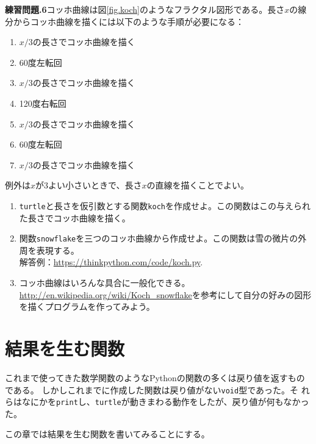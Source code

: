 \documentclass[a4j,12pt,makeidx]{jbook}
\newcommand{\tp}{\thechapter}
\begin{document}
\noindent
{\bf 練習問題\tp.6}コッホ曲線は図\ref{fig.koch}のようなフラクタル図形である。長さ{$x$}の線分からコッホ曲線を描くには以下のような手順が必要になる：
\begin{enumerate}
\item $x/3$の長さでコッホ曲線を描く
\item 60度左転回
\item $x/3$の長さでコッホ曲線を描く
\item 120度右転回
\item $x/3$の長さでコッホ曲線を描く
\item 60度左転回
\item $x/3$の長さでコッホ曲線を描く
\end{enumerate}
例外は$x$が$3$よい小さいときで、長さ$x$の直線を描くことでよい。\\

\begin{enumerate}
\item {\tt turtle}と長さを仮引数とする関数{\tt koch}を作成せよ。この関数はこの与えられた長さでコッホ曲線を描く。
\item 関数{\tt snowflake}を三つのコッホ曲線から作成せよ。この関数は雪の微片の外周を表現する。\\
解答例：\url{https://thinkpython.com/code/koch.py}.
\item コッホ曲線はいろんな具合に一般化できる。\\
\url{http://en.wikipedia.org/wiki/Koch_snowflake}を参考にして自分の好みの図形を描くプログラムを作ってみよう。
\end{enumerate}
%
\chapter{結果を生む関数}
これまで使ってきた数学関数のようなPythonの関数の多くは戻り値を返すものである。
しかしこれまでに作成した関数は戻り値がない{\tt void}型であった。そ
れらはなにかを{\tt print}し、{\tt turtle}が動きまわる動作をしたが、戻り値が何もなかった。 \par
この章では結果を生む関数を書いてみることにする。
%
\end{document}
